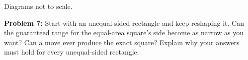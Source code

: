 \documentclass[12pt]{article}
\newcommand{\problem}[2]{\par\textbf{Problem #1:} #2\par}
\begin{document}
\begin{center}\small Diagrams not to scale.\end{center}
\vspace{19mm}
\problem{7}{Start with an unequal-sided rectangle and keep reshaping it. Can the guaranteed range for the equal-area square's side become as narrow as you want? Can a move ever produce the exact square? Explain why your answers must hold for every unequal-sided rectangle.}
\vfill
\end{document}
